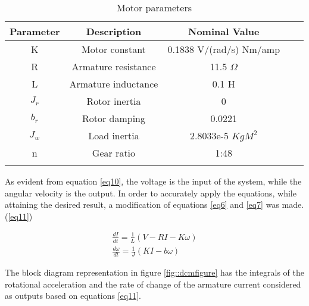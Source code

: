 \begin{table}[h]
\centering
\begin{tabular}{cccll}
\hline
Parameter                   & Description                               & Nominal Value                                 &  &  \\ \hline
\multicolumn{1}{|c|}{K}     & \multicolumn{1}{c|}{Motor constant}       & \multicolumn{1}{c|}{0.1838 V/(rad/s)  Nm/amp} &  &  \\ \cline{1-3}
\multicolumn{1}{|c|}{R}     & \multicolumn{1}{c|}{Armature resistance}  & \multicolumn{1}{c|}{11.5 $\Omega$}            &  &  \\ \cline{1-3}
\multicolumn{1}{|c|}{L}     & \multicolumn{1}{c|}{Armature inductance}  & \multicolumn{1}{c|}{0.1 H}                    &  &  \\ \cline{1-3}
\multicolumn{1}{|c|}{$J_r$} & \multicolumn{1}{c|}{Rotor inertia}       & \multicolumn{1}{c|}{0}                        &  &  \\ \cline{1-3}
\multicolumn{1}{|c|}{$b_r$} & \multicolumn{1}{c|}{Rotor damping}        & \multicolumn{1}{c|}{0.0221}                   &  &  \\ \cline{1-3}
\multicolumn{1}{|c|}{$J_w$} & \multicolumn{1}{c|}{Load inertia} & \multicolumn{1}{c|}{2.8033e-5 $KgM^2$}        &  &  \\ \cline{1-3}
\multicolumn{1}{|c|}{n}     & \multicolumn{1}{c|}{Gear ratio}           & \multicolumn{1}{c|}{1:48}                     &  &  \\ \cline{1-3}
\multicolumn{1}{l}{}        & \multicolumn{1}{l}{}                      & \multicolumn{1}{l}{}                          &  &  \\ \hline
\end{tabular}
\caption{Motor parameters}
\label{motor_par}
\end{table}

As evident from equation \ref{eq10}, the voltage is the input of the system, while the angular velocity is the output. In order to accurately apply the equations, while attaining the desired result, a modification of equations \ref{eq6} and \ref{eq7} was made.(\ref{eq11})

\begin{align}
\frac{dI}{dt} = \frac{1}{L}(V - RI - K\omega)\label{eq11} \\
\frac{d\omega}{dt} = \frac{1}{J}(KI - b\omega) \nonumber
\end{align}

The block diagram representation in figure \ref{fig::dcmfigure} has the integrals of the rotational acceleration and the rate of change of the armature current considered as outputs based on equations \ref{eq11}.

